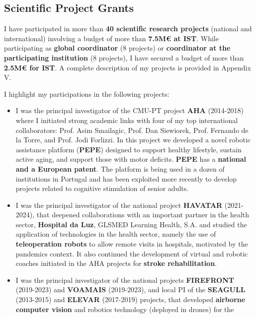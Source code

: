 \documentclass[
]{article}
\begin{document}
\subsection{Scientific Project Grants}\label{scientific-project-grants}

I have participated in more than \textbf{40 scientific research
projects} (national and international) involving a budget of more than
\textbf{7.5M€ at IST}. While participating as \textbf{global
coordinator} (8 projects) or \textbf{coordinator at the participating
institution} (8 projects), I have secured a budget of more than
\textbf{2.5M€ for IST}. A complete description of my projects is
provided in Appendix V.

I highlight my participations in the following projects:

\begin{itemize}
\item
  I was the principal investigator of the CMU-PT project \textbf{AHA}
  (2014-2018) where I initiated strong academic links with four of my
  top international collaborators: Prof. Asim Smailagic, Prof. Dan
  Siewiorek, Prof. Fernando de la Torre, and Prof. Jodi Forlizzi. In
  this project we developed a novel robotic assistance platform
  (\textbf{PEPE}) designed to support healthy lifestyle, sustain active
  aging, and support those with motor deficits. \textbf{PEPE} has a
  \textbf{national and a European patent}. The platform is being used in
  a dozen of institutions in Portugal and has been exploited more
  recently to develop projects related to cognitive stimulation of
  senior adults.
\item
  I was the principal investigator of the national project
  \textbf{HAVATAR} (2021-2024), that deepened collaborations with an
  important partner in the health sector, \textbf{Hospital da Luz},
  GLSMED Learning Health, S.A. and studied the application of
  technologies in the health sector, namely the use of
  \textbf{teleoperation robots} to allow remote visits in hospitals,
  motivated by the pandemics context. It also continued the development
  of virtual and robotic coaches initiated in the AHA projects for
  \textbf{stroke rehabilitation}.
\item
  I was the principal investigator of the national projects
  \textbf{FIREFRONT} (2019-2023) and \textbf{VOAMAIS} (2019-2023), and
  local PI of the \textbf{SEAGULL} (2013-2015) and \textbf{ELEVAR}
  (2017-2019) projects, that developed \textbf{airborne computer vision}
  and robotics technology (deployed in drones) for the

\end{itemize}
\end{document}
